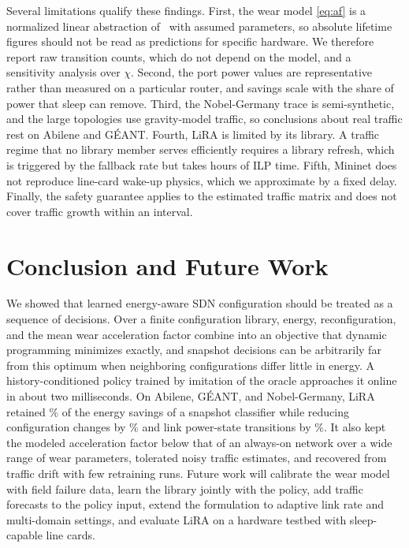 \documentclass[journal]{IEEEtran}
\begin{document}
Several limitations qualify these findings. First, the wear model \eqref{eq:af} is a normalized linear abstraction of~\cite{chiaraviglio2015lifetime} with assumed parameters, so absolute lifetime figures should not be read as predictions for specific hardware. We therefore report raw transition counts, which do not depend on the model, and a sensitivity analysis over $\chi$. Second, the port power values are representative rather than measured on a particular router, and savings scale with the share of power that sleep can remove. Third, the Nobel-Germany trace is semi-synthetic, and the large topologies use gravity-model traffic, so conclusions about real traffic rest on Abilene and G\'{E}ANT. Fourth, LiRA is limited by its library. A traffic regime that no library member serves efficiently requires a library refresh, which is triggered by the fallback rate but takes hours of ILP time. Fifth, Mininet does not reproduce line-card wake-up physics, which we approximate by a fixed delay. Finally, the safety guarantee applies to the estimated traffic matrix and does not cover traffic growth within an interval.

\section{Conclusion and Future Work}\label{sec:conclusion}

We showed that learned energy-aware SDN configuration should be treated as a sequence of decisions. Over a finite configuration library, energy, reconfiguration, and the mean wear acceleration factor combine into an objective that dynamic programming minimizes exactly, and snapshot decisions can be arbitrarily far from this optimum when neighboring configurations differ little in energy. A history-conditioned policy trained by imitation of the oracle approaches it online in about two milliseconds. On Abilene, G\'{E}ANT, and Nobel-Germany, LiRA retained \resRetention\% of the energy savings of a snapshot classifier while reducing configuration changes by \resChangeRed\% and link power-state transitions by \resTransRed\%. It also kept the modeled acceleration factor below that of an always-on network over a wide range of wear parameters, tolerated noisy traffic estimates, and recovered from traffic drift with few retraining runs. Future work will calibrate the wear model with field failure data, learn the library jointly with the policy, add traffic forecasts to the policy input, extend the formulation to adaptive link rate and multi-domain settings, and evaluate LiRA on a hardware testbed with sleep-capable line cards.
\end{document}
